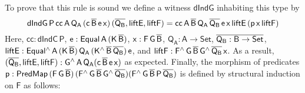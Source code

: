 \documentclass[9pt]{entcs}
\begin{document}
To prove that this rule is sound we define a witness
$\mathsf{dIndG}$ inhabiting this type by
\[\mathsf{dIndG\,P\,cc\,A\,Q_A\,(c\,\overline{B}\,e\,x)\,(\overline{Q_B}, liftE, liftF)
= cc\,A\,\overline{B}\,Q_A\,\overline{Q_B}\,e\,x\,liftE\,(p\,x\,liftF)}\] Here,
$\mathsf{cc : dIndC\,P}$, $\mathsf{e : Equal\,A\,(K\,\overline{B})}$,
$\mathsf{x : F\,G\,\overline{B}}$, $\mathsf{Q_A : A \to Set}$,
$\overline{\mathsf{Q_B : B \to Set}}$, $\mathsf{liftE :
  Equal^{\wedge}\,A\,(K\,\overline{B})\,Q_A\,
  (K^{\wedge}\,\overline{B}\,\overline{Q_B})\,e}$, and $\mathsf{liftF :
  F^{\wedge}\,G\,\overline{B}\,G^{\wedge}\,{\overline{Q_B}}\,x}$. As a result,
$\mathsf{(\overline{Q_B}, liftE, liftF) : G^{\wedge}\,A\,Q_A (c\,\overline{B}\,
  e\,x)}$ as expected.  Finally, the morphism of predicates $\mathsf{p
  :
  PredMap\,(F\,G\,\overline{B})\,(F^{\wedge}\,G\,\overline{B}\,G^{\wedge}\,\overline{Q_B})
  (F^{\wedge}\,G\,\overline{B}\,P\,\overline{Q_B})}$ is defined by structural
induction on $\mathsf{F}$ as follows:
\end{document}
